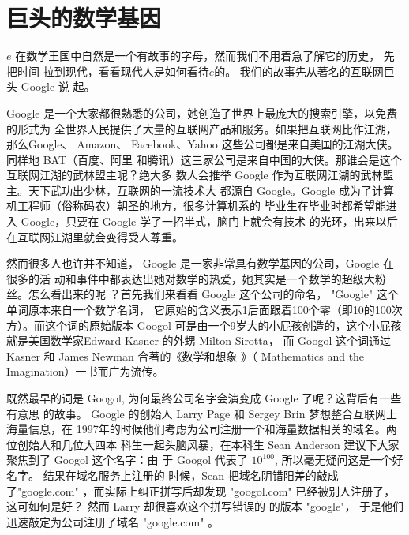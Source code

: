 \section{巨头的数学基因}
$e$ 在数学王国中自然是一个有故事的字母，然而我们不用着急了解它的历史， 先把时间
拉到现代，看看现代人是如何看待$e$的。 我们的故事先从著名的互联网巨头 Google 说
起。

Google 是一个大家都很熟悉的公司，她创造了世界上最庞大的搜索引擎，以免费的形式为
全世界人民提供了大量的互联网产品和服务。如果把互联网比作江湖，那么Google、
Amazon、 Facebook、Yahoo 这些公司都是来自美国的江湖大侠。同样地 BAT（百度、阿里
和腾讯）这三家公司是来自中国的大侠。那谁会是这个互联网江湖的武林盟主呢？绝大多
数人会推举 Google 作为互联网江湖的武林盟主。天下武功出少林，互联网的一流技术大
都源自 Google。Google 成为了计算机工程师（俗称码农）朝圣的地方，很多计算机系的
毕业生在毕业时都希望能进入 Google，只要在 Google 学了一招半式，脑门上就会有技术
的光环，出来以后在互联网江湖里就会变得受人尊重。

然而很多人也许并不知道， Google 是一家非常具有数学基因的公司，Google 在很多的活
动和事件中都表达出她对数学的热爱，她其实是一个数学的超级大粉丝。怎么看出来的呢
？首先我们来看看 Google 这个公司的命名， "Google" 这个单词原本来自一个数学名词，
它原始的含义表示1后面跟着100个零（即10的100次方）。而这个词的原始版本 Googol
可是由一个9岁大的小屁孩创造的，这个小屁孩就是美国数学家Edward Kasner 的外甥
Milton Sirotta， 而 Googol 这个词通过Kasner 和 James Newman 合著的《数学和想象
》（ Mathematics and the Imagination）一书而广为流传。

既然最早的词是 Googol, 为何最终公司名字会演变成 Google 了呢？这背后有一些有意思
的故事。 Google 的创始人 Larry Page 和 Sergey Brin 梦想整合互联网上海量信息，在
1997年的时候他们考虑为公司注册一个和海量数据相关的域名。两位创始人和几位大四本
科生一起头脑风暴，在本科生 Sean Anderson 建议下大家聚焦到了 Googol 这个名字：由
于 Googol 代表了 $10^100$, 所以毫无疑问这是一个好名字。 结果在域名服务上注册的
时候，Sean 把域名阴错阳差的敲成了"google.com" ，而实际上纠正拼写后却发现
"googol.com" 已经被别人注册了，这可如何是好？ 然而 Larry 却很喜欢这个拼写错误的
的版本 "google"， 于是他们迅速敲定为公司注册了域名 "google.com" 。


